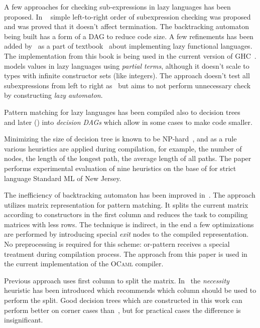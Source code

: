 A few approaches for checking sub-expressions in lazy languages has been proposed. In ~\cite{augustsson1985} simple left-to-right order of subexpression checking was proposed and was proved that it doesn't affect termination. The backtracking automaton being built has a form of a DAG to reduce code size. A few refinements has been added by~\cite{wadler1987} as a part of textbook~\cite{peytonjones1987} about implementing lazy functional languages. The implementation from this book is being used in the current version of GHC~\cite{ghc}. \cite{laville1991} models values in lazy languages
using \emph{partial terms}, although it doesn't scale to types with infinite constructor sets (like integers). The approach doesn't test all subexpressions from left to right as~\cite{augustsson1985} but aims to not perform unnecessary check by constructing \emph{lazy automaton}. 

Pattern matching for lazy languages has been compiled also to decision trees~\cite{maranget1992} and later (\cite{maranget1994}) into
\emph{decision DAGs} which allow in some cases to make code smaller.

Minimizing the size of decision tree is known to be NP-hard~\cite{baudinet1985tree}, and as a rule various heuristics are applied during compilation, for example, the number of nodes,
the length of the longest path, the average length of all paths. The paper~\cite{Scott2000WhenDM} performs experimental evaluation of nine heuristics on the base of for strict language Standard ML of New Jersey.

The inefficiency of backtracking automaton has been
improved in~\cite{maranget2001}. The approach utilizes matrix representation for pattern matching. It splits the current matrix according to constructors in the
first column and reduces the task to compiling matrices with less rows. The technique is indirect, in the end a few optimizations are performed by introducing
special \emph{exit} nodes to the compiled representation. No preprocessing is required for this scheme: or-pattern receives a special treatment during compilation process.
The approach from this paper is used in the current implementation of the \textsc{OCaml} compiler.

Previous approach uses first column to split the matrix. In~\cite{maranget2008} the \emph{necessity} heuristic has been introduced which recommends which column should be
used to perform the split. Good decision trees which are constructed in this work can perform better on corner cases than~\cite{maranget2001}, but for practical cases the
difference is insignificant.


